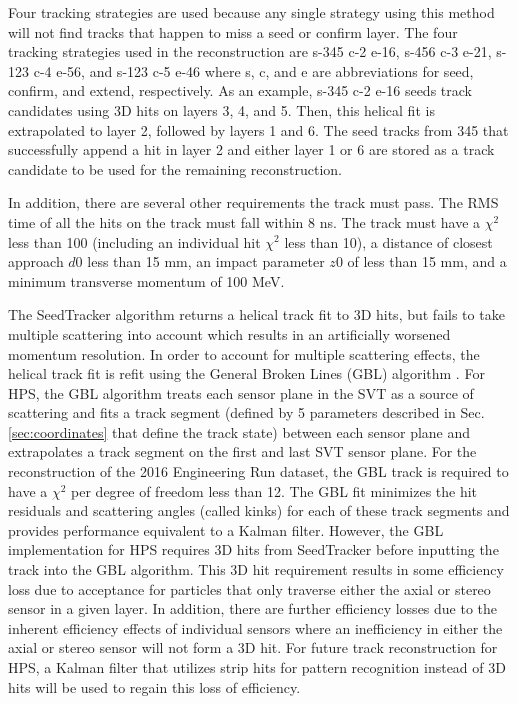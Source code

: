 Four tracking strategies are used because any single strategy using this method will not find tracks that happen to miss a seed or confirm layer. The four tracking strategies used in the reconstruction are s-345 c-2 e-16, s-456 c-3 e-21, s-123 c-4 e-56, and s-123 c-5 e-46 where s, c, and e are abbreviations for seed, confirm, and extend, respectively. As an example, s-345 c-2 e-16 seeds track candidates using 3D hits on layers 3, 4, and 5. Then, this helical fit is extrapolated to layer 2, followed by layers 1 and 6. The seed tracks from 345 that successfully append a hit in layer 2 and either layer 1 or 6 are stored as a track candidate to be used for the remaining reconstruction.

In addition, there are several other requirements the track must pass. The RMS time of all the hits on the track must fall within 8 ns. The track must have a $\chi^2$ less than 100 (including an individual hit $\chi^2$ less than 10), a distance of closest approach $d0$ less than 15 mm, an impact parameter $z0$ of less than 15 mm, and a minimum transverse momentum of 100 MeV. 

The SeedTracker algorithm returns a helical track fit to 3D hits, but fails to take multiple scattering into account which results in an artificially worsened momentum resolution. In order to account for multiple scattering effects, the helical track fit is refit using the General Broken Lines (GBL) algorithm \cite{BLOBEL200614} \cite{Kleinwort_2012}. For HPS, the GBL algorithm treats each sensor plane in the SVT as a source of scattering and fits a track segment (defined by 5 parameters described in Sec. \ref{sec:coordinates} that define the track state) between each sensor plane and extrapolates a track segment on the first and last SVT sensor plane. For the reconstruction of the 2016 Engineering Run dataset, the GBL track is required to have a $\chi^2$ per degree of freedom less than 12. The GBL fit minimizes the hit residuals and scattering angles (called kinks) for each of these track segments and provides performance equivalent to a Kalman filter. However, the GBL implementation for HPS requires 3D hits from SeedTracker before inputting the track into the GBL algorithm. This 3D hit requirement results in some efficiency loss due to acceptance for particles that only traverse either the axial or stereo sensor in a given layer. In addition, there are further efficiency losses due to the inherent efficiency effects of individual sensors where an inefficiency in either the axial or stereo sensor will not form a 3D hit. For future track reconstruction for HPS, a Kalman filter that utilizes strip hits for pattern recognition instead of 3D hits will be used to regain this loss of efficiency.


